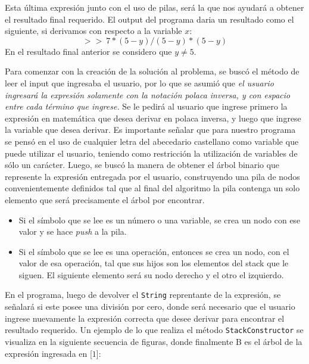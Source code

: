\documentclass[letterpaper,11pt]{article} %
\begin{document}
Esta última expresión junto con el uso de pilas, será la que nos ayudará a obtener el resultado final requerido. El output del programa daria un resultado como el siguiente, si derivamos con respecto a la variable $x$:
$$> >\ 7 * (5 - y) / (5 - y) * (5 - y)$$
En el resultado final anterior se considero que $y\neq 5$.

\newpage
{}
Para comenzar con la creación de la solución al problema, se buscó el método de leer el input que ingresaba el usuario, por lo que se asumió que \textit{el usuario ingresará la expresión solamente con la notación polaca inversa, y con espacio entre cada término que ingrese.}
\newp Se le pedirá al usuario que ingrese primero la expresión en matemática que desea derivar en polaca inversa, y luego que ingrese la variable que desea derivar. Es importante señalar que para nuestro programa se pensó en el uso de cualquier letra del abecedario castellano como variable que puede utilizar el usuario, teniendo como restricción la utilización de variables de sólo un carácter.
\newp Luego, se buscó la manera de obtener el árbol binario que represente la expresión entregada por el usuario, construyendo una pila de nodos convenientemente definidos tal que al final del algoritmo la pila contenga un solo elemento que será precisamente el árbol por encontrar. 
\begin{itemize}
\item Si el símbolo que se lee es un número o una variable, se crea un nodo con ese valor y se hace 
\textit{push} a la pila.

\item Si el símbolo que se lee es una operación, entonces se crea un nodo, con el valor de esa 
operación, tal que sus hijos son los elementos del stack que le siguen. El siguiente elemento 
será su nodo derecho y el otro el izquierdo.
\end{itemize}

En el programa, luego de devolver el \texttt{String} reprentante de la expresión, se señalará si este posee una división por cero, donde será necesario que el usuario ingrese nuevamente la expresión correcta que desee derivar para encontrar el resultado requerido.
\newp Un ejemplo de lo que realiza el método \texttt{StackConstructor} se visualiza en la siguiente secuencia de figuras, donde finalmente B es el árbol de la expresión ingresada en [$1$]:
\end{document}
